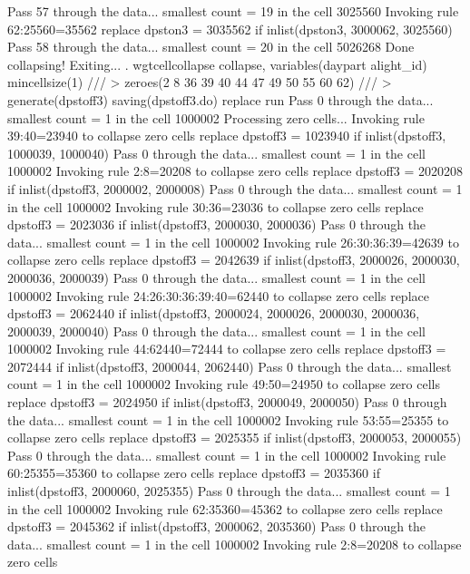 Pass 57 through the data...
  smallest count = 19 in the cell      3025560
  Invoking rule 62:25560=35562
  replace dpston3 = 3035562 if inlist(dpston3, 3000062, 3025560)
Pass 58 through the data...
  smallest count = 20 in the cell      5026268
  Done collapsing! Exiting...
{\smallskip}
. wgtcellcollapse collapse, variables(daypart alight_id) mincellsize(1) ///
>         zeroes(2 8 36 39 40 44 47 49 50 55 60 62) ///
>         generate(dpstoff3) saving(dpstoff3.do) replace run
Pass 0 through the data...
  smallest count = 1 in the cell      1000002
{\smallskip}
Processing zero cells...
{\smallskip}
  Invoking rule 39:40=23940 to collapse zero cells
  replace dpstoff3 = 1023940 if inlist(dpstoff3, 1000039, 1000040)
Pass 0 through the data...
  smallest count = 1 in the cell      1000002
  Invoking rule 2:8=20208 to collapse zero cells
  replace dpstoff3 = 2020208 if inlist(dpstoff3, 2000002, 2000008)
Pass 0 through the data...
  smallest count = 1 in the cell      1000002
  Invoking rule 30:36=23036 to collapse zero cells
  replace dpstoff3 = 2023036 if inlist(dpstoff3, 2000030, 2000036)
Pass 0 through the data...
  smallest count = 1 in the cell      1000002
  Invoking rule 26:30:36:39=42639 to collapse zero cells
  replace dpstoff3 = 2042639 if inlist(dpstoff3, 2000026, 2000030, 2000036, 2000039)
Pass 0 through the data...
  smallest count = 1 in the cell      1000002
  Invoking rule 24:26:30:36:39:40=62440 to collapse zero cells
  replace dpstoff3 = 2062440 if inlist(dpstoff3, 2000024, 2000026, 2000030, 2000036, 2000039, 2000040)
Pass 0 through the data...
  smallest count = 1 in the cell      1000002
  Invoking rule 44:62440=72444 to collapse zero cells
  replace dpstoff3 = 2072444 if inlist(dpstoff3, 2000044, 2062440)
Pass 0 through the data...
  smallest count = 1 in the cell      1000002
  Invoking rule 49:50=24950 to collapse zero cells
  replace dpstoff3 = 2024950 if inlist(dpstoff3, 2000049, 2000050)
Pass 0 through the data...
  smallest count = 1 in the cell      1000002
  Invoking rule 53:55=25355 to collapse zero cells
  replace dpstoff3 = 2025355 if inlist(dpstoff3, 2000053, 2000055)
Pass 0 through the data...
  smallest count = 1 in the cell      1000002
  Invoking rule 60:25355=35360 to collapse zero cells
  replace dpstoff3 = 2035360 if inlist(dpstoff3, 2000060, 2025355)
Pass 0 through the data...
  smallest count = 1 in the cell      1000002
  Invoking rule 62:35360=45362 to collapse zero cells
  replace dpstoff3 = 2045362 if inlist(dpstoff3, 2000062, 2035360)
Pass 0 through the data...
  smallest count = 1 in the cell      1000002
  Invoking rule 2:8=20208 to collapse zero cells

